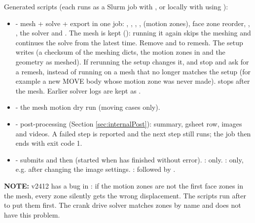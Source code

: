 Generated scripts (each runs as a Slurm job with , or locally with  using ):
\begin{itemize}
    \item {} - mesh + solve + export in one job: , , , ,  (motion zones), face zone reorder, , , the solver and . The mesh is kept (): running it again skips the meshing and continues the solve from the latest time. Remove  and  to remesh. The setup writes  (a checksum of the meshing dicts, the motion zones in  and the geometry as meshed). If rerunning the setup changes it,  and  stop and ask for a remesh, instead of running on a mesh that no longer matches the setup (for example a new MOVE body whose motion zone was never made).  stops after the mesh. Earlier solver logs are kept as .
    \item {} - the mesh motion dry run (moving cases only).
    \item {} - post-processing (Section \ref{sec:internalPost}): summary, gsheet row, images and videos. A failed step is reported and the next step still runs; the job then ends with exit code 1.
    \item {} - submits  and then  (started when  has finished without error). :  only. :  only, e.g. after changing the image settings. :  followed by .
\end{itemize}

\textbf{NOTE:} v2412 has a bug in : if the motion zones are not the first face zones in the mesh, every zone silently gets the wrong displacement. The scripts run  after  to put them first. The crank drive solver matches zones by name and does not have this problem.

